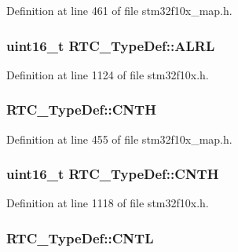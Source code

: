 Definition at line 461 of file stm32f10x\+\_\+map.\+h.

\subsubsection[{\texorpdfstring{A\+L\+RL}{ALRL}}]{ {\bf uint16\+\_\+t} R\+T\+C\+\_\+\+Type\+Def\+::\+A\+L\+RL}\hypertarget{struct_r_t_c___type_def_afea5d3abb40323a5385cf461094c06d3}{}\label{struct_r_t_c___type_def_afea5d3abb40323a5385cf461094c06d3}


Definition at line 1124 of file stm32f10x.\+h.

\subsubsection[{\texorpdfstring{C\+N\+TH}{CNTH}}]{ R\+T\+C\+\_\+\+Type\+Def\+::\+C\+N\+TH}\hypertarget{struct_r_t_c___type_def_a28463f714f48aa6757742396ad274a74}{}\label{struct_r_t_c___type_def_a28463f714f48aa6757742396ad274a74}


Definition at line 455 of file stm32f10x\+\_\+map.\+h.

\subsubsection[{\texorpdfstring{C\+N\+TH}{CNTH}}]{ {\bf uint16\+\_\+t} R\+T\+C\+\_\+\+Type\+Def\+::\+C\+N\+TH}\hypertarget{struct_r_t_c___type_def_a094741bcc8fca018b500f7468531f0ef}{}\label{struct_r_t_c___type_def_a094741bcc8fca018b500f7468531f0ef}


Definition at line 1118 of file stm32f10x.\+h.

\subsubsection[{\texorpdfstring{C\+N\+TL}{CNTL}}]{ R\+T\+C\+\_\+\+Type\+Def\+::\+C\+N\+TL}\hypertarget{struct_r_t_c___type_def_aaedc2fea88ef92a56ff3ed9a91c41fee}{}\label{struct_r_t_c___type_def_aaedc2fea88ef92a56ff3ed9a91c41fee}


